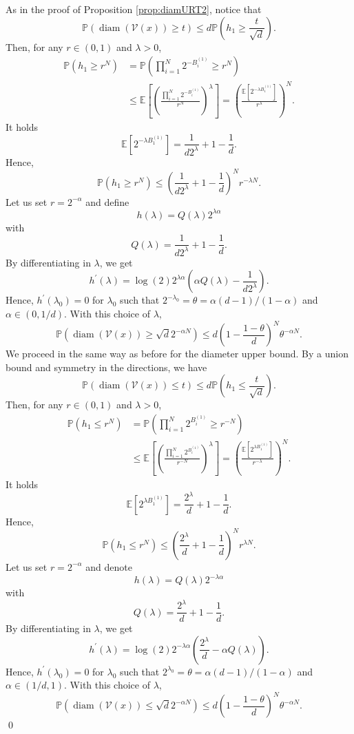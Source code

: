 \documentclass[paper=a4, fontsize=11pt]{scrartcl}
\newcommand{\diam}{\operatorname{diam}}
\newcommand{\pr}{\mathbb{P}}
\newcommand{\PP}{\mathbb{P}}
\begin{document}
As in the proof of Proposition \ref{prop:diamURT2}, notice that \[ \pr(  \diam (\mathcal{V}(x))\geq t) \leq d\pr \left(h_1 \geq \frac{t}{\sqrt{d}}\right). \]
Then, for any $r\in (0,1)$ and $\lambda>0$,
\begin{align*}
    \pr(h_1 \geq r^N) & = \pr\left(\prod_{i=1}^N 2^{-B_i^{(1)}} \geq r^N\right)\\
    & \leq \mathbb E\left[\left(\frac{\prod_{i=1}^N 2^{-B_i^{(1)}}}{r^N}\right)^\lambda \right]=\left(\frac{\mathbb E\left[{2^{-\lambda B_1^{(1)}}}\right]}{r^{\lambda}}\right)^N. 
\end{align*}
It holds
\[
 \mathbb E\left[{2^{-\lambda B_1^{(1)}}}\right]= \frac{1}{d2^{\lambda}}+1-\frac{1}{d}.
\]
Hence,
\[
 \pr(h_1 \geq r^N) \leq \left(\frac{1}{d2^{\lambda}}+1-\frac{1}{d}\right)^N r^{-\lambda N}.
\]
Let us set $r=2^{-\alpha}$ and define 
\[
h(\lambda)= Q(\lambda) 2^{\lambda \alpha}
\]
with
\[
Q(\lambda)= \frac{1}{d2^{\lambda}}+1-\frac{1}{d}.
\]
By differentiating in $\lambda$, we get
\[
h^{\prime}(\lambda)=\log(2) 2^{\lambda \alpha}\left(\alpha Q(\lambda)-\frac{1}{d2^\lambda}\right).
\]
Hence, $h^{\prime}(\lambda_0)=0$ for $\lambda_0$ such that $2^{-\lambda_0}=\theta=\alpha (d-1)/(1-\alpha)$ and $\alpha \in (0,1/d)$. With this choice of $\lambda$, 
\[
 \PP(\diam(\mathcal{V}(x))\geq \sqrt{d}2^{-\alpha N}) \leq d\left(1-\frac{1-\theta}{d}\right)^N \theta^{-\alpha N}.
\]
We proceed in the same way as before for the diameter upper bound. By a union bound and symmetry in the directions, we have
\[
 \pr(  \diam (\mathcal{V}(x))\leq t) \leq d\pr \left(h_1 \leq \frac{t}{\sqrt{d}}\right).
\]
Then, for any $r\in (0,1)$ and $\lambda>0$,
\begin{align*}
    \pr(h_1 \leq r^N) & = \pr\left(\prod_{i=1}^N 2^{B_i^{(1)}} \geq r^{-N}\right)\\
    & \leq \mathbb E\left[\left(\frac{\prod_{i=1}^N 2^{B_i^{(1)}}}{r^{-N}}\right)^\lambda \right]=\left(\frac{\mathbb E\left[{2^{\lambda B_1^{(1)}}}\right]}{r^{-\lambda}}\right)^N. 
\end{align*}
It holds
\[
 \mathbb E\left[{2^{\lambda B_1^{(1)}}}\right]= \frac{2^{\lambda}}{d}+1-\frac{1}{d}.
\]
Hence,
\[
 \pr(h_1 \leq r^N) \leq \left(\frac{2^{\lambda}}{d}+1-\frac{1}{d}\right)^N r^{\lambda N}.
\]
Let us set $r=2^{-\alpha}$ and denote 
\[
h(\lambda)= Q(\lambda) 2^{-\lambda \alpha}
\]
with
\[
Q(\lambda)= \frac{2^{\lambda}}{d}+1-\frac{1}{d}.
\]
By differentiating in $\lambda$, we get
\[
h^{\prime}(\lambda)=\log(2) 2^{-\lambda \alpha}\left(\frac{2^\lambda}{d}-\alpha Q(\lambda)\right).
\]
Hence, $h^{\prime}(\lambda_0)=0$ for $\lambda_0$ such that $2^{\lambda_0}=\theta=\alpha (d-1)/(1-\alpha)$ and $\alpha \in (1/d , 1)$. With this choice of $\lambda$, 
\[
 \PP(\diam(\mathcal{V}(x))\leq \sqrt{d}2^{-\alpha N}) \leq d\left(1-\frac{1-\theta}{d}\right)^N \theta^{-\alpha N}.
\]
\qed
\end{document}
